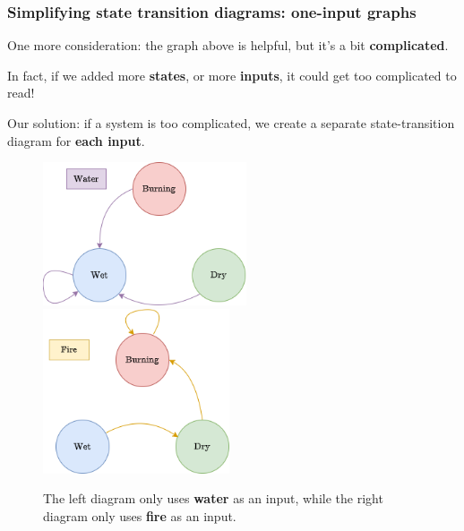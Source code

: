             
        \subsecdiv
        
        \subsubsection{Simplifying state transition diagrams: one-input graphs}
            
            One more consideration: the graph above is helpful, but it's a bit \textbf{complicated}. 
            
            In fact, if we added more \textbf{states}, or more \textbf{inputs}, it could get too complicated to read!
            
            Our solution: if a system is too complicated, we create a separate state-transition diagram for \textbf{each input}.
            
            \begin{figure}[H]
                \centering
                \includegraphics[width=60mm,scale=0.4]{images/rnn_images/std_water_no_label.png}
                \qquad
                \includegraphics[width=55mm,scale=0.4]{images/rnn_images/std_fire.png}
                
                \caption*{The left diagram only uses \textbf{water} as an input, while the right diagram only uses \textbf{fire} as an input.}
            \end{figure}
            
